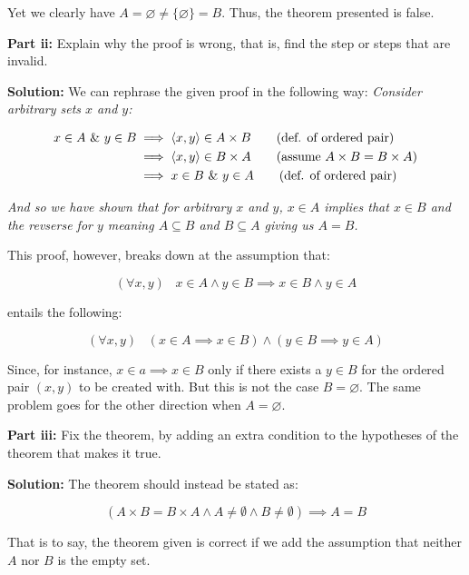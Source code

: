 \documentclass{article}
\begin{document}
Yet we clearly have $A=\varnothing\not=\{\varnothing\}=B$. Thus, the theorem presented is false.
\bigskip

\noindent\textbf{Part ii:} Explain why the proof is wrong, that is, find the step or steps that are invalid.
\bigskip

\noindent\textbf{Solution:} We can rephrase the given proof in the following way: \textit{Consider arbitrary sets $x$ and $y$:}

\begin{align*}
    x\in A\,\,\&\,\, y\in B&\implies\langle x,y\rangle\in A\times B\tag{def. of ordered pair}\\
    &\implies\langle x,y\rangle\in B\times A\tag{assume $A\times B=B\times A$}\\
    &\implies x\in B\,\,\&\,\, y\in A\tag{def. of ordered pair}
\end{align*}

\textit{And so we have shown that for arbitrary $x$ and $y$, $x\in A$ implies that $x\in B$ and the revserse for $y$ meaning $A\subseteq B$ and $B\subseteq A$ giving us $A=B$.}

This proof, however, breaks down at the assumption that:

\begin{equation*}
    (\forall x,y)\,\,\,\,\,x\in A\wedge y\in B\implies x\in B\wedge y\in A
\end{equation*}

entails the following:

\begin{equation*}
    (\forall x,y)\,\,\,\,\,(x\in A\implies x\in B)\wedge (y\in B\implies y\in A)
\end{equation*}

Since, for instance, $x\in a\implies x\in B$ only if there exists a $y\in B$ for the ordered pair $(x,y)$ to be created with. But this is not the case $B=\varnothing$. The same problem goes for the other direction when $A=\varnothing$.
\bigskip

\noindent\textbf{Part iii:} Fix the theorem, by adding an extra condition to the hypotheses of the theorem that makes it true.
\bigskip

\noindent\textbf{Solution:} The theorem should instead be stated as:

\begin{equation*}
    (A\times B=B\times A\wedge A\not=\emptyset\wedge B\not=\emptyset)\implies A=B
\end{equation*}

That is to say, the theorem given is correct if we add the assumption that neither $A$ nor $B$ is the empty set.
\bigskip
\end{document}
